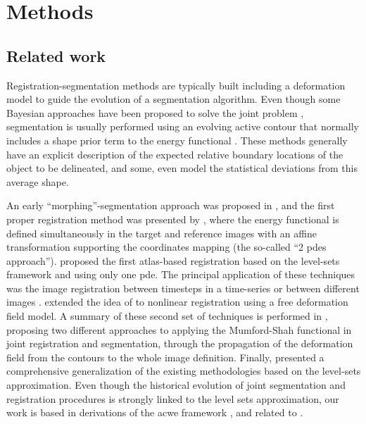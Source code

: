 \section{Methods}
\label{sec:methods}
%
\subsection{Related work}
\label{sec:methods_background}
Registration-segmentation methods are typically built including a deformation
  model to guide the evolution of a segmentation algorithm.
Even though some Bayesian approaches have been proposed to solve the joint problem
  \citep{wyatt_map_2003}, segmentation is usually performed using an evolving
  active contour \citep{chan_active_2001} that normally includes a shape prior
  term to the energy functional \citep{chen_using_2002,bresson_variational_2006,
  chan_level_2005,cremers_kernel_2006,gastaud_combining_2004}.
These methods generally have an explicit description of the expected relative boundary
  locations of the object to be delineated, and some, even model the statistical deviations
  from this average shape.


An early ``morphing''-segmentation approach was proposed in \citep{bertalmio_morphing_2000},
  and the first proper registration method was presented by \citeauthor{yezzi_variational_2001}
  \citep{yezzi_variational_2001}, where the energy functional is defined simultaneously in the target
  and reference images with an affine transformation supporting the coordinates mapping
  (the so-called ``2 \glspl*{pde} approach'').
\citeauthor{vemuri_joint_2003} proposed the first atlas-based registration \citep{vemuri_joint_2003}
  based on the level-sets framework and using only one \gls*{pde}.
The principal application of these techniques was the image registration between timesteps in
  a time-series or between different images \citep{paragios_level_2003}.
\citeauthor{unal_coupled_2005} \citep{unal_coupled_2005} extended the idea of
  \citep{bertalmio_morphing_2000,yezzi_variational_2001} to nonlinear registration
  using a free deformation field model.
A summary of these second set of techniques is performed in \citep{droske_mumfordshah_2009},
  proposing two different approaches to applying the Mumford-Shah \citep{mumford_optimal_1989}
  functional in joint registration and segmentation, through the propagation of the deformation
  field from the contours to the whole image definition.
Finally, \citeauthor{gorthi_active_2011} presented a comprehensive generalization of the
  existing methodologies \citep{gorthi_active_2011} based on the level-sets approximation.
Even though the historical evolution of joint segmentation and registration procedures is strongly
  linked to the level sets approximation, our work is based in derivations of the \acrlong{acwe}
  framework \citep{chan_active_2001}, and related to \citep{guyader_combined_2011}.


